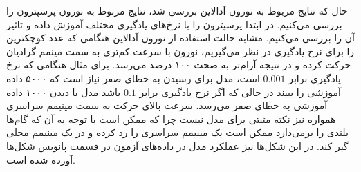 \documentclass[12pt, a4paper]{article}
\begin{document}
حال که نتایج مربوط به نورون آدالاین بررسی شد، نتایج مربوط به نورون پرسپترون را بررسی می‌کنیم.
در ابتدا پرسپترون را با نرخ‌های یادگیری مختلف آموزش داده و تاثیر آن را بررسی می‌کنیم. مشابه حالت استفاده از
نورون آدالاین هنگامی که عدد کوچکترین را برای نرخ یادگیری در نظر می‌گیریم، نورون با سرعت کم‌تری به سمت
مینمم گرادیان حرکت کرده و در نتیجه آرام‌تر به صحت ۱۰۰ درصد می‌رسد. برای مثال هنگامی که نرخ یادگیری
برابر $0.001$ است، مدل برای رسیدن به خطای صفر نیاز است که ۵۰۰۰ داده آموزشی را ببیند در حالی که اگر
نرخ یادگیری برابر $0.1$ باشد مدل با دیدن ۱۰۰۰ داده آموزشی به خطای صفر می‌رسد. سرعت بالای حرکت به سمت
مینیمم سراسری همواره نیز نکته مثبتی برای مدل نیست چرا که ممکن است با توجه به آن که گام‌ها بلندی را
برمی‌دارد ممکن است یک مینیمم سراسری را رد کرده و در یک مینیمم محلی گیر کند. در این شکل‌ها نیز عملکرد مدل
در داده‌های آزمون در قسمت پانویس شکل‌ها آورده شده است.
\end{document}
